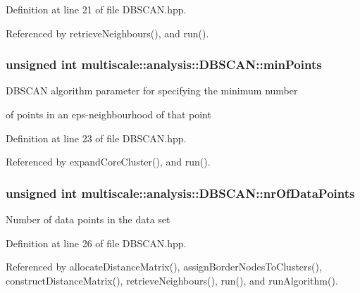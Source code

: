 Definition at line 21 of file D\-B\-S\-C\-A\-N.\-hpp.



Referenced by retrieve\-Neighbours(), and run().

\hypertarget{classmultiscale_1_1analysis_1_1DBSCAN_a7bafd4070ac44e236fcc7f06d92b6572}{
\subsubsection[{min\-Points}]{\setlength{\rightskip}{0pt plus 5cm}unsigned int multiscale\-::analysis\-::\-D\-B\-S\-C\-A\-N\-::min\-Points\hspace{0.3cm}{\ttfamily [private]}}}\label{classmultiscale_1_1analysis_1_1DBSCAN_a7bafd4070ac44e236fcc7f06d92b6572}
\begin{DoxyVerb}                  DBSCAN algorithm parameter for specifying the minimum number
\end{DoxyVerb}
 of points in an eps-\/neighbourhood of that point 

Definition at line 23 of file D\-B\-S\-C\-A\-N.\-hpp.



Referenced by expand\-Core\-Cluster(), and run().

\hypertarget{classmultiscale_1_1analysis_1_1DBSCAN_af81a42ca24493494b3d20e27c76be016}{
\subsubsection[{nr\-Of\-Data\-Points}]{\setlength{\rightskip}{0pt plus 5cm}unsigned int multiscale\-::analysis\-::\-D\-B\-S\-C\-A\-N\-::nr\-Of\-Data\-Points\hspace{0.3cm}{\ttfamily [private]}}}\label{classmultiscale_1_1analysis_1_1DBSCAN_af81a42ca24493494b3d20e27c76be016}
Number of data points in the data set 

Definition at line 26 of file D\-B\-S\-C\-A\-N.\-hpp.



Referenced by allocate\-Distance\-Matrix(), assign\-Border\-Nodes\-To\-Clusters(), construct\-Distance\-Matrix(), retrieve\-Neighbours(), run(), and run\-Algorithm().



